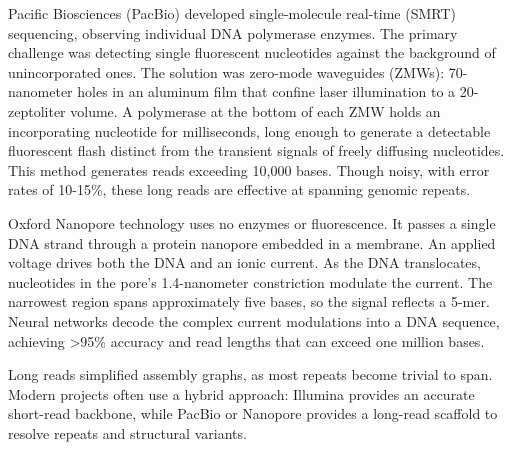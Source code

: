 Pacific Biosciences (PacBio) developed single-molecule real-time (SMRT) sequencing, observing individual DNA polymerase enzymes. The primary challenge was detecting single fluorescent nucleotides against the background of unincorporated ones. The solution was zero-mode waveguides (ZMWs): 70-nanometer holes in an aluminum film that confine laser illumination to a 20-zeptoliter volume. A polymerase at the bottom of each ZMW holds an incorporating nucleotide for milliseconds, long enough to generate a detectable fluorescent flash distinct from the transient signals of freely diffusing nucleotides. This method generates reads exceeding 10,000 bases. Though noisy, with error rates of 10-15\%, these long reads are effective at spanning genomic repeats.

Oxford Nanopore technology uses no enzymes or fluorescence. It passes a single DNA strand through a protein nanopore embedded in a membrane. An applied voltage drives both the DNA and an ionic current. As the DNA translocates, nucleotides in the pore's 1.4-nanometer constriction modulate the current. The narrowest region spans approximately five bases, so the signal reflects a 5-mer. Neural networks decode the complex current modulations into a DNA sequence, achieving >95\% accuracy and read lengths that can exceed one million bases.

Long reads simplified assembly graphs, as most repeats become trivial to span. Modern projects often use a hybrid approach: Illumina provides an accurate short-read backbone, while PacBio or Nanopore provides a long-read scaffold to resolve repeats and structural variants.

